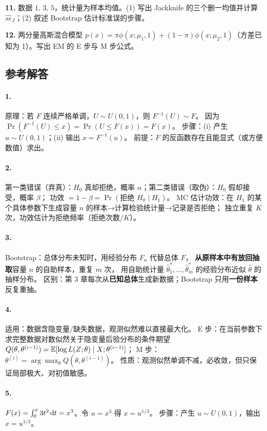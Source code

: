 \textbf{11.} 数据 $1,\,3,\,5$，统计量为样本均值。(1) 写出 Jackknife 的三个删一均值并计算 $\widehat{se}_J$；(2) 叙述 Bootstrap 估计标准误的步骤。

\textbf{12.} 两分量高斯混合模型 $p(x)=\pi\phi(x;\mu_1,1)+(1-\pi)\phi(x;\mu_2,1)$（方差已知为 1）。写出 EM 的 E 步与 M 步公式。

\newpage
\subsection*{参考解答}

\paragraph{1.}
原理：若 $F$ 连续严格单调，$U\sim U(0,1)$，则 $F^{-1}(U)\sim F$。
因为 $\Pr(F^{-1}(U)\le x)=\Pr(U\le F(x))=F(x)$。
步骤：(i) 产生 $u\sim U(0,1)$；(ii) 输出 $x=F^{-1}(u)$。
前提：$F$ 的反函数存在且能显式（或方便数值）求出。

\paragraph{2.}
第一类错误（弃真）：$H_0$ 真却拒绝，概率 $\alpha$；第二类错误（取伪）：$H_0$ 假却接受，概率 $\beta$；
功效 $=1-\beta=\Pr(\text{拒绝 }H_0\mid H_1)$。
MC 估计功效：在 $H_1$ 的某个具体参数下生成容量 $n$ 的样本→计算检验统计量→记录是否拒绝；
独立重复 $K$ 次，功效估计为拒绝频率（拒绝次数$/K$）。

\paragraph{3.}
Bootstrap：总体分布未知时，用经验分布 $F_n$ 代替总体 $F$，
\textbf{从原样本中有放回抽取}容量 $n$ 的自助样本，重复 $m$ 次，
用自助统计量 $\hat\theta^*_1,\dots,\hat\theta^*_m$ 的经验分布近似 $\hat\theta$ 的抽样分布。
区别：第 3 章每次从\textbf{已知总体}生成新数据；Bootstrap 只用\textbf{一份样本}反复重抽。

\paragraph{4.}
适用：数据含隐变量/缺失数据，观测似然难以直接最大化。
E 步：在当前参数下求完整数据对数似然关于隐变量后验分布的条件期望
$Q(\theta,\theta^{(i-1)})=\mathbb{E}[\log L(Z;\theta)\mid X;\theta^{(i-1)}]$；
M 步：$\theta^{(i)}=\arg\max_\theta Q(\theta,\theta^{(i-1)})$。
性质：观测似然单调不减，必收敛，但只保证局部极大、对初值敏感。

\paragraph{5.}
$F(x)=\int_0^x 3t^2\,\mathrm{d} t=x^3$。令 $u=x^3$ 得 $x=u^{1/3}$。
步骤：产生 $u\sim U(0,1)$，输出 $x=u^{1/3}$。

